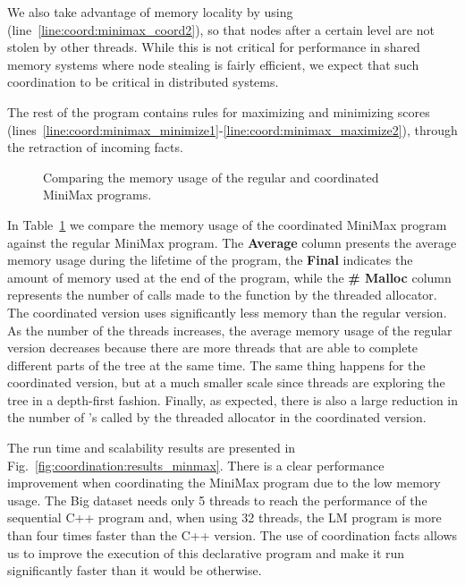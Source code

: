 We also take advantage of memory locality by using 
(line~\ref{line:coord:minimax_coord2}), so that nodes after a certain level are
   not stolen by other threads. While this is not critical for performance in
   shared memory systems where node stealing is fairly efficient, we expect that
   such coordination to be critical in distributed systems.

The rest of the program contains rules for maximizing and minimizing scores
(lines~\ref{line:coord:minimax_minimize1}-\ref{line:coord:minimax_maximize2}),
through the retraction of  incoming facts.

\begin{figure}[ht]
   \begin{center}
      
   \end{center}

   \caption{Comparing the memory usage of the regular and coordinated MiniMax
   programs.}
   \label{results:memory_minmax}
\end{figure}

In Table~\ref{results:memory_minmax} we compare the memory usage of the
coordinated MiniMax program against the regular MiniMax program. The
\textbf{Average} column presents the average memory usage during the lifetime of
the program, the \textbf{Final} indicates the amount of memory used at the end
of the program, while the \textbf{\# Malloc} column represents the number of
calls made to the  function by the threaded allocator. The
coordinated version uses significantly less memory than the regular version. As
the number of the threads increases, the average memory usage of the regular
version decreases because there are more threads that are able to complete
different parts of the tree at the same time. The same thing happens for the
coordinated version, but at a much smaller scale since threads are exploring the
tree in a depth-first fashion. Finally, as expected, there is also a large
reduction in the number of 's called by the threaded allocator in
the coordinated version.

The run time and scalability results are presented in
Fig.~\ref{fig:coordination:results_minmax}. There is a clear performance
improvement when coordinating the MiniMax program due to the low memory usage.
The Big dataset needs only 5 threads to reach the performance of the
sequential C++ program and, when using 32 threads, the LM program is more than
four times faster than the C++ version. The use of coordination facts allows us
to improve the execution of this declarative program and make it run
significantly faster than it would be otherwise.

